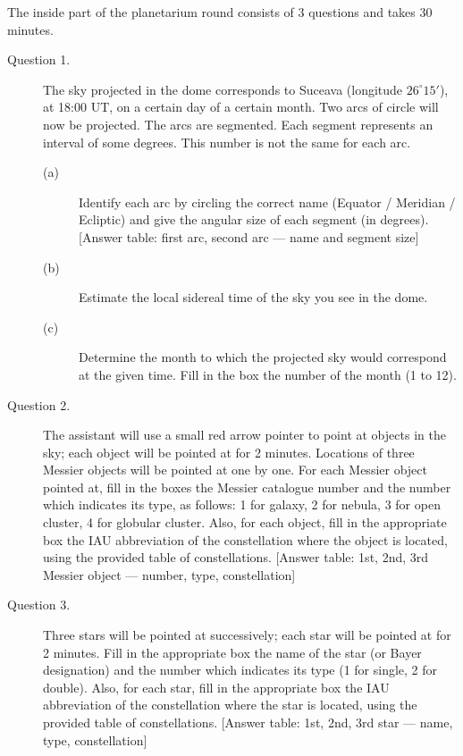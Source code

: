 The inside part of the planetarium round consists of 3 questions and takes
30 minutes.

\begin{description}
\item[Question 1.] The sky projected in the dome corresponds to Suceava
  (longitude $26^\circ 15'$), at 18:00 UT, on a certain day of a certain
  month. Two arcs of circle will now be projected. The arcs are segmented.
  Each segment represents an interval of some degrees. This number is not
  the same for each arc.
  \begin{description}
  \item[(a)] Identify each arc by circling the correct name (Equator /
    Meridian / Ecliptic) and give the angular size of each segment (in
    degrees).
    [Answer table: first arc, second arc --- name and segment size]
  \item[(b)] Estimate the local sidereal time of the sky you see in the
    dome.
  \item[(c)] Determine the month to which the projected sky would correspond
    at the given time. Fill in the box the number of the month (1 to 12).
  \end{description}
\item[Question 2.] The assistant will use a small red arrow pointer to point
  at objects in the sky; each object will be pointed at for 2 minutes.
  Locations of three Messier objects will be pointed at one by one. For each
  Messier object pointed at, fill in the boxes the Messier catalogue number
  and the number which indicates its type, as follows: 1 for galaxy, 2 for
  nebula, 3 for open cluster, 4 for globular cluster. Also, for each object,
  fill in the appropriate box the IAU abbreviation of the constellation
  where the object is located, using the provided table of constellations.
  [Answer table: 1st, 2nd, 3rd Messier object --- number, type,
  constellation]
\item[Question 3.] Three stars will be pointed at successively; each star
  will be pointed at for 2 minutes. Fill in the appropriate box the name of
  the star (or Bayer designation) and the number which indicates its type
  (1 for single, 2 for double). Also, for each star, fill in the appropriate
  box the IAU abbreviation of the constellation where the star is located,
  using the provided table of constellations.
  [Answer table: 1st, 2nd, 3rd star --- name, type, constellation]
\end{description}
